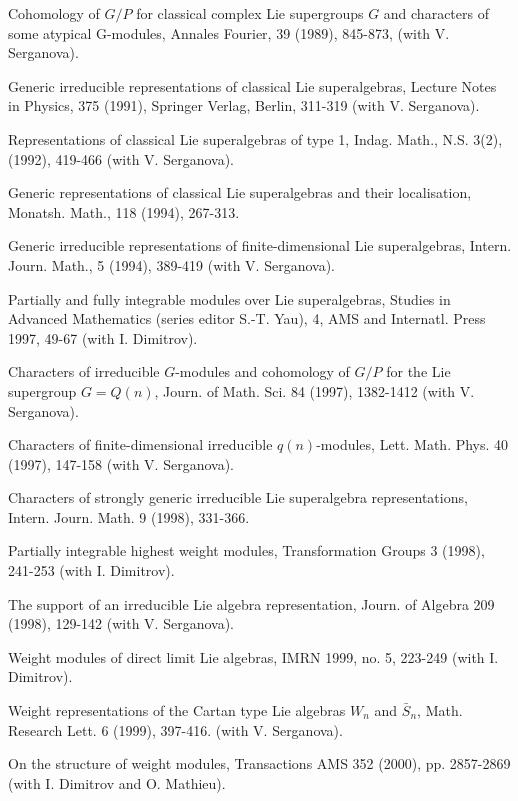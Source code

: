 \myss \label{16.} Cohomology of $G/P$ for classical complex Lie
supergroups $G$ and characters of some atypical G-modules, Annales
Fourier, 39 (1989), 845-873, (with V. Serganova).

\myss \label{17.}  Generic irreducible representations of
classical Lie superalgebras, Lecture Notes in Physics, 375 (1991),
Springer Verlag, Berlin, 311-319 (with V. Serga\-nova).

\myss \label{18.}  Representations of classical Lie superalgebras
of type 1, Indag. Math., N.S. 3(2), (1992), 419-466 (with V.
Serganova).

\myss \label{19.}  Generic representations of classical Lie
superalgebras and their localisation, Monatsh. Math., 118 (1994),
267-313.

\myss \label{20.}  Generic irreducible representations of
finite-dimensional Lie superalgebras, Intern. Journ. Math., 5
(1994), 389-419 (with V. Serganova).

\myss \label{21.}  Partially and fully integrable modules over Lie
superalgebras, Studies in Advanced Mathematics (series editor
S.-T. Yau), 4, AMS and Internatl. Press 1997, 49-67 (with I.
Dimitrov).

\myss \label{22.}  Characters of irreducible $G$-modules and
cohomology of $G/P$ for the Lie supergroup $G=Q(n)$, Journ. of
Math. Sci. 84 (1997), 1382-1412 (with V. Serganova).

\myss \label{23.}  Characters of finite-dimensional irreducible
$q(n)$-modules, Lett. Math. Phys.  40 (1997), 147-158 (with V.
Serganova).

\myss \label{24.}  Characters of strongly generic irreducible Lie
superalgebra representations, Intern. Journ. Math. 9 (1998),
331-366.

\myss \label{25.}  Partially integrable highest weight modules,
Transformation Groups 3 (1998), 241-253 (with I. Dimitrov).

\myss \label{26.}  The support of an irreducible Lie algebra
representation, Journ. of Algebra 209 (1998), 129-142 (with V.
Serganova).

\myss \label{27.} Weight modules of direct limit Lie algebras,
IMRN 1999, no. 5, 223-249  (with I. Dimitrov).

\myss \label{28.} Weight representations of the Cartan type Lie
algebras $W_n$ and $\bar{S}_n$, Math. Research Lett. 6 (1999),
397-416. (with V. Serganova).

\myss \label{29.}  On the structure of weight modules,
Transactions AMS 352 (2000), pp. 2857-2869 (with I. Dimitrov and O.
Mathieu).

